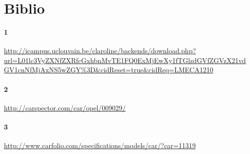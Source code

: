 \documentclass{article}
\begin{document}
\section{Biblio}
\paragraph{1}
\url{http://icampus.uclouvain.be/claroline/backends/download.php?url=L01lc3VyZXNfZXRfcGxhbnMvTE1FQ0ExMjEwXy1fTGlzdGVfZGVzX21vdGV1cnNfMjAxNS5wZGY%3D&cidReset=true&cidReq=LMECA1210}
\paragraph{2}
\url{http://carspector.com/car/opel/009029/}
\paragraph{3}
\url{http://www.carfolio.com/specifications/models/car/?car=11319}
\end{document}
